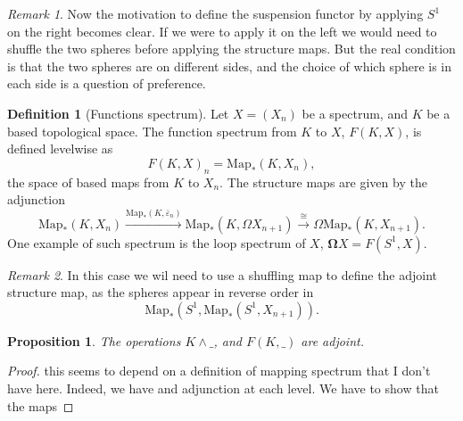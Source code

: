 \documentclass[a4paper,english,11pt]{article}
\theoremstyle{definition}
\newtheorem{Def}{Definition}
\theoremstyle{plain}
\newtheorem{prop}{Proposition}[section]
\theoremstyle{remark}
\newtheorem{rem}{\color{red}Remark}
\newcommand{\Map}{\text{Map}}
\newcommand{\lspec}{\mathbf{\Omega}}
\newcommand{\astruc}{\bar{\varepsilon}}
\begin{document}
\begin{rem}
  Now the motivation to define the suspension functor by applying \(S^1\) on the right becomes clear. If we were to apply it on the left we would need to shuffle the two spheres before applying the structure maps. But the real condition is that the two spheres are on different sides, and the choice of which sphere is in each side is a question of {\color{red} preference}.
\end{rem}
\begin{Def}[Functions spectrum]
  Let \(X=(X_n)\) be a spectrum, and \(K\) be a based topological space. The function spectrum from \(K\) to \(X\), \(F(K,X)\), is defined levelwise as
  \[F(K,X)_n= \Map_\ast(K,X_n),\]
  the space of based maps from \(K\) to \(X_n\). The structure maps are given by the adjunction
  \[\Map_\ast(K,X_n)\xrightarrow{\Map_\ast(K,\astruc_n)}\Map_\ast(K,\Omega X_{n+1})\xrightarrow{\cong}\Omega \Map_\ast(K,X_{n+1}).\]
  One example of such spectrum is the loop spectrum of \(X\), \(\lspec X=F(S^1,X)\).
\end{Def}
\begin{rem}
  In this case we wil need to use a shuffling map to define the adjoint structure map, as the spheres appear in reverse order in 
  \[\Map_\ast(S^1,\Map_\ast(S^1,X_{n+1})).\] 
\end{rem}
\begin{prop}
  The operations \(K\wedge\_\), and \(F(K,\_)\) are adjoint.  
\end{prop}
\begin{proof}
  {\color{red} this seems to depend on a definition of mapping spectrum that I don't have here.}
  Indeed, we have and adjunction at each level. We have to show that the maps  

\end{proof}
\end{document}
